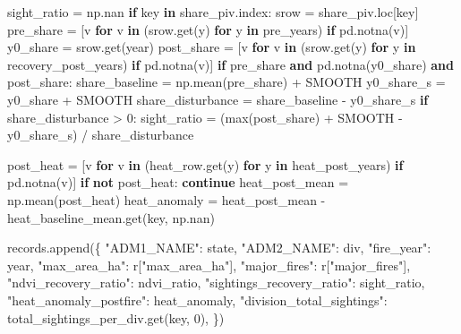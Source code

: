 \documentclass[
  letterpaper,
  DIV=11,
  numbers=noendperiod]{scrartcl}
\newenvironment{Shaded}{\begin{snugshade}}{\end{snugshade}}
\newcommand{\BuiltInTok}[1]{\textcolor[rgb]{0.00,0.23,0.31}{#1}}
\newcommand{\ControlFlowTok}[1]{\textcolor[rgb]{0.00,0.23,0.31}{\textbf{#1}}}
\newcommand{\DecValTok}[1]{\textcolor[rgb]{0.68,0.00,0.00}{#1}}
\newcommand{\KeywordTok}[1]{\textcolor[rgb]{0.00,0.23,0.31}{\textbf{#1}}}
\newcommand{\NormalTok}[1]{\textcolor[rgb]{0.00,0.23,0.31}{#1}}
\newcommand{\OperatorTok}[1]{\textcolor[rgb]{0.37,0.37,0.37}{#1}}
\newcommand{\StringTok}[1]{\textcolor[rgb]{0.13,0.47,0.30}{#1}}
\begin{document}
\begin{Shaded}
\begin{Highlighting}[]
\NormalTok{    sight\_ratio }\OperatorTok{=}\NormalTok{ np.nan}
    \ControlFlowTok{if}\NormalTok{ key }\KeywordTok{in}\NormalTok{ share\_piv.index:}
\NormalTok{        srow }\OperatorTok{=}\NormalTok{ share\_piv.loc[key]}
\NormalTok{        pre\_share }\OperatorTok{=}\NormalTok{ [v }\ControlFlowTok{for}\NormalTok{ v }\KeywordTok{in}\NormalTok{ (srow.get(y) }\ControlFlowTok{for}\NormalTok{ y }\KeywordTok{in}\NormalTok{ pre\_years) }\ControlFlowTok{if}\NormalTok{ pd.notna(v)]}
\NormalTok{        y0\_share }\OperatorTok{=}\NormalTok{ srow.get(year)}
\NormalTok{        post\_share }\OperatorTok{=}\NormalTok{ [v }\ControlFlowTok{for}\NormalTok{ v }\KeywordTok{in}\NormalTok{ (srow.get(y) }\ControlFlowTok{for}\NormalTok{ y }\KeywordTok{in}\NormalTok{ recovery\_post\_years) }\ControlFlowTok{if}\NormalTok{ pd.notna(v)]}
        \ControlFlowTok{if}\NormalTok{ pre\_share }\KeywordTok{and}\NormalTok{ pd.notna(y0\_share) }\KeywordTok{and}\NormalTok{ post\_share:}
\NormalTok{            share\_baseline }\OperatorTok{=}\NormalTok{ np.mean(pre\_share) }\OperatorTok{+}\NormalTok{ SMOOTH}
\NormalTok{            y0\_share\_s }\OperatorTok{=}\NormalTok{ y0\_share }\OperatorTok{+}\NormalTok{ SMOOTH}
\NormalTok{            share\_disturbance }\OperatorTok{=}\NormalTok{ share\_baseline }\OperatorTok{{-}}\NormalTok{ y0\_share\_s}
            \ControlFlowTok{if}\NormalTok{ share\_disturbance }\OperatorTok{\textgreater{}} \DecValTok{0}\NormalTok{:}
\NormalTok{                sight\_ratio }\OperatorTok{=}\NormalTok{ (}\BuiltInTok{max}\NormalTok{(post\_share) }\OperatorTok{+}\NormalTok{ SMOOTH }\OperatorTok{{-}}\NormalTok{ y0\_share\_s) }\OperatorTok{/}\NormalTok{ share\_disturbance}

\NormalTok{    post\_heat }\OperatorTok{=}\NormalTok{ [v }\ControlFlowTok{for}\NormalTok{ v }\KeywordTok{in}\NormalTok{ (heat\_row.get(y) }\ControlFlowTok{for}\NormalTok{ y }\KeywordTok{in}\NormalTok{ heat\_post\_years) }\ControlFlowTok{if}\NormalTok{ pd.notna(v)]}
    \ControlFlowTok{if} \KeywordTok{not}\NormalTok{ post\_heat:}
        \ControlFlowTok{continue}
\NormalTok{    heat\_post\_mean }\OperatorTok{=}\NormalTok{ np.mean(post\_heat)}
\NormalTok{    heat\_anomaly }\OperatorTok{=}\NormalTok{ heat\_post\_mean }\OperatorTok{{-}}\NormalTok{ heat\_baseline\_mean.get(key, np.nan)}

\NormalTok{    records.append(\{}
        \StringTok{"ADM1\_NAME"}\NormalTok{: state, }\StringTok{"ADM2\_NAME"}\NormalTok{: div, }\StringTok{"fire\_year"}\NormalTok{: year,}
        \StringTok{"max\_area\_ha"}\NormalTok{: r[}\StringTok{"max\_area\_ha"}\NormalTok{], }\StringTok{"major\_fires"}\NormalTok{: r[}\StringTok{"major\_fires"}\NormalTok{],}
        \StringTok{"ndvi\_recovery\_ratio"}\NormalTok{: ndvi\_ratio, }\StringTok{"sightings\_recovery\_ratio"}\NormalTok{: sight\_ratio,}
        \StringTok{"heat\_anomaly\_postfire"}\NormalTok{: heat\_anomaly,}
        \StringTok{"division\_total\_sightings"}\NormalTok{: total\_sightings\_per\_div.get(key, }\DecValTok{0}\NormalTok{),}
\NormalTok{    \})}


\end{Highlighting}
\end{Shaded}
\end{document}
